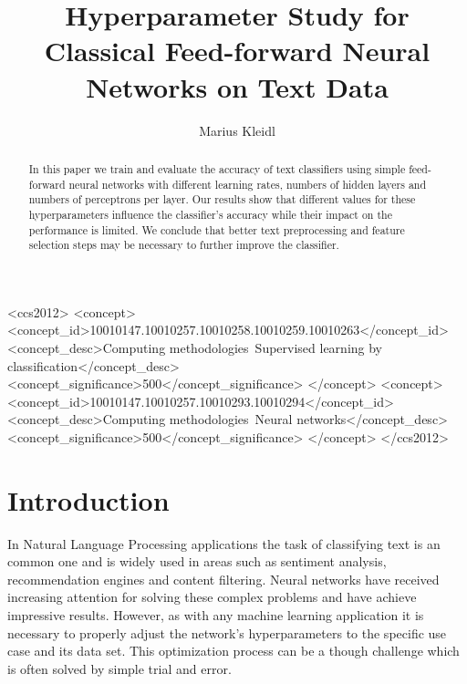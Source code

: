 \documentclass[sigconf]{acmart}
\begin{document}
\title{Hyperparameter Study for Classical Feed-forward Neural Networks on Text Data}

\author{Marius Kleidl}

\begin{abstract}
	In this paper we train and evaluate the accuracy of text classifiers using simple feed-forward neural networks with different learning rates, numbers of hidden layers and numbers of perceptrons per layer. Our results show that different values for these hyperparameters influence the classifier's accuracy while their impact on the performance is limited. We conclude that better text preprocessing and feature selection steps may be necessary to further improve the classifier.
\end{abstract}

%
%
\begin{CCSXML}
	<ccs2012>
	<concept>
	<concept_id>10010147.10010257.10010258.10010259.10010263</concept_id>
	<concept_desc>Computing methodologies~Supervised learning by classification</concept_desc>
	<concept_significance>500</concept_significance>
	</concept>
	<concept>
	<concept_id>10010147.10010257.10010293.10010294</concept_id>
	<concept_desc>Computing methodologies~Neural networks</concept_desc>
	<concept_significance>500</concept_significance>
	</concept>
	</ccs2012>
\end{CCSXML}



\maketitle

\section{Introduction}

In Natural Language Processing applications the task of classifying text is an common one and is widely used in areas such as sentiment analysis, recommendation engines and content filtering. Neural networks have received increasing attention for solving these complex problems and have achieve impressive results. However, as with any machine learning application it is necessary to properly adjust the network's hyperparameters to the specific use case and its data set. This optimization process can be a though challenge which is often solved by simple trial and error.
\end{document}

